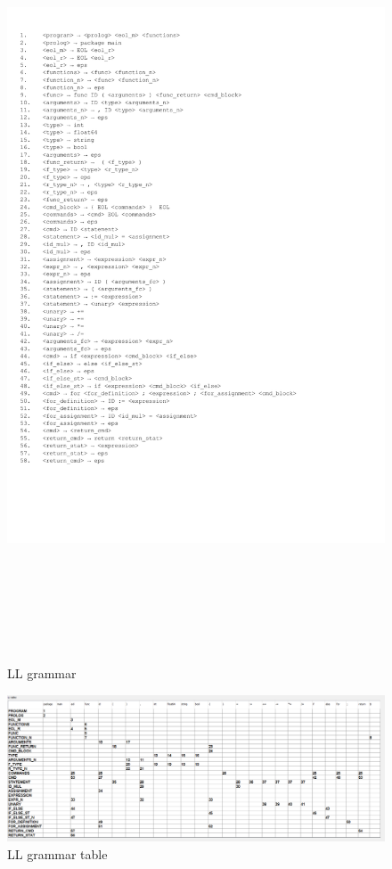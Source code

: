 \documentclass[11pt, titlepage]{article}
\begin{document}
\begin{center}
	\begin{figure}
		\includegraphics[width=\linewidth, height=650pt]{LL_grammar}
		\caption{LL grammar}
		\label{fig:LLgramar}
	\end{figure}
\end{center}

\begin{center}
	\begin{figure}
		\includegraphics[width=\linewidth]{LL_table}
		\caption{LL grammar table}
		\label{fig:LLtable}
	\end{figure}
\end{center}
\end{document}
